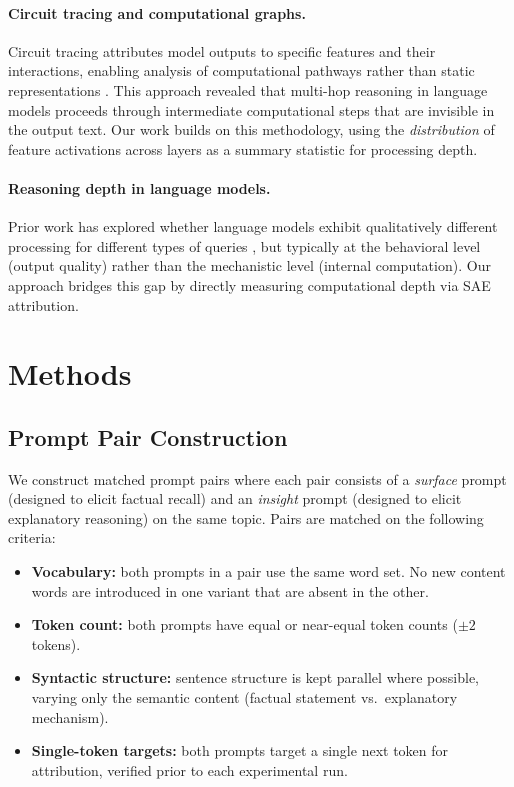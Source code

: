 \documentclass[10pt]{article}
\begin{document}
\paragraph{Circuit tracing and computational graphs.}
Circuit tracing attributes model outputs to specific features and their interactions, enabling analysis of computational pathways rather than static representations \citep{anthropic2025biology}. This approach revealed that multi-hop reasoning in language models proceeds through intermediate computational steps that are invisible in the output text. Our work builds on this methodology, using the \textit{distribution} of feature activations across layers as a summary statistic for processing depth.

\paragraph{Reasoning depth in language models.}
Prior work has explored whether language models exhibit qualitatively different processing for different types of queries \citep{wei2022chain, dziri2023faith}, but typically at the behavioral level (output quality) rather than the mechanistic level (internal computation). Our approach bridges this gap by directly measuring computational depth via SAE attribution.

\section{Methods}

\subsection{Prompt Pair Construction}

We construct matched prompt pairs where each pair consists of a \textit{surface} prompt (designed to elicit factual recall) and an \textit{insight} prompt (designed to elicit explanatory reasoning) on the same topic. Pairs are matched on the following criteria:

\begin{itemize}
    \item \textbf{Vocabulary:} both prompts in a pair use the same word set. No new content words are introduced in one variant that are absent in the other.
    \item \textbf{Token count:} both prompts have equal or near-equal token counts ($\pm 2$ tokens).
    \item \textbf{Syntactic structure:} sentence structure is kept parallel where possible, varying only the semantic content (factual statement vs.\ explanatory mechanism).
    \item \textbf{Single-token targets:} both prompts target a single next token for attribution, verified prior to each experimental run.
\end{itemize}
\end{document}
